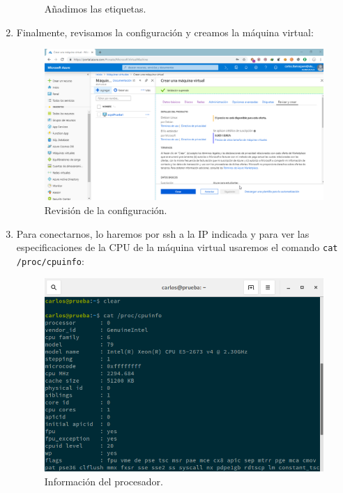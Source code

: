 \begin{enumerate}
\begin{figure}[h]
		\caption{Añadimos las etiquetas.}
		\label{Añadimos las etiqutas2}
	\end{figure}
\newpage
	\item Finalmente, revisamos la configuración y creamos la máquina virtual:
	\begin{figure}[h]
		\centering
		\includegraphics[scale=0.35]{ImagenesAzure/10.png}
		\caption{Revisión de la configuración.}
		\label{Revisión de la configuración}
	\end{figure}
	\item Para conectarnos, lo haremos por ssh a la IP indicada y para ver las especificaciones de la CPU de la máquina virtual usaremos el comando \texttt{cat /proc/cpuinfo}:
	\begin{figure}[h]
		\centering
		\includegraphics[scale=0.45]{ImagenesAzure/cpuinfo.png}
		\caption{Información del procesador.}
		\label{Información del procesador}
	\end{figure}
\end{enumerate}